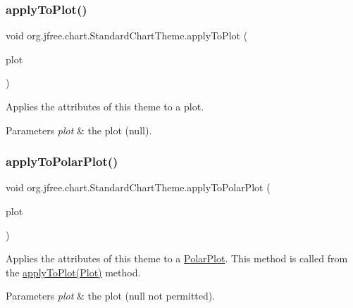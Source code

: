 \subsubsection{\texorpdfstring{apply\+To\+Plot()}{applyToPlot()}}
{\footnotesize\ttfamily void org.\+jfree.\+chart.\+Standard\+Chart\+Theme.\+apply\+To\+Plot (\begin{DoxyParamCaption}\item[{\mbox{\hyperlink{classorg_1_1jfree_1_1chart_1_1plot_1_1_plot}{Plot}}}]{plot }\end{DoxyParamCaption})\hspace{0.3cm}{\ttfamily [protected]}}

Applies the attributes of this theme to a plot.


\begin{DoxyParams}{Parameters}
{\em plot} & the plot ({\ttfamily null}). \\
\hline
\end{DoxyParams}
\mbox{\label{classorg_1_1jfree_1_1chart_1_1_standard_chart_theme_a1b04db2c709cb58872986a484f61a7a4}} 
\subsubsection{\texorpdfstring{apply\+To\+Polar\+Plot()}{applyToPolarPlot()}}
{\footnotesize\ttfamily void org.\+jfree.\+chart.\+Standard\+Chart\+Theme.\+apply\+To\+Polar\+Plot (\begin{DoxyParamCaption}\item[{\mbox{\hyperlink{classorg_1_1jfree_1_1chart_1_1plot_1_1_polar_plot}{Polar\+Plot}}}]{plot }\end{DoxyParamCaption})\hspace{0.3cm}{\ttfamily [protected]}}

Applies the attributes of this theme to a \mbox{\hyperlink{}{Polar\+Plot}}. This method is called from the \mbox{\hyperlink{classorg_1_1jfree_1_1chart_1_1_standard_chart_theme_ad80532276c7939f2edd60c1c54447d49}{apply\+To\+Plot(\+Plot)}} method.


\begin{DoxyParams}{Parameters}
{\em plot} & the plot ({\ttfamily null} not permitted). \\
\hline
\end{DoxyParams}
\mbox{\label{classorg_1_1jfree_1_1chart_1_1_standard_chart_theme_a2439220f7a9c614524d4e2a5e179c45f}} 
